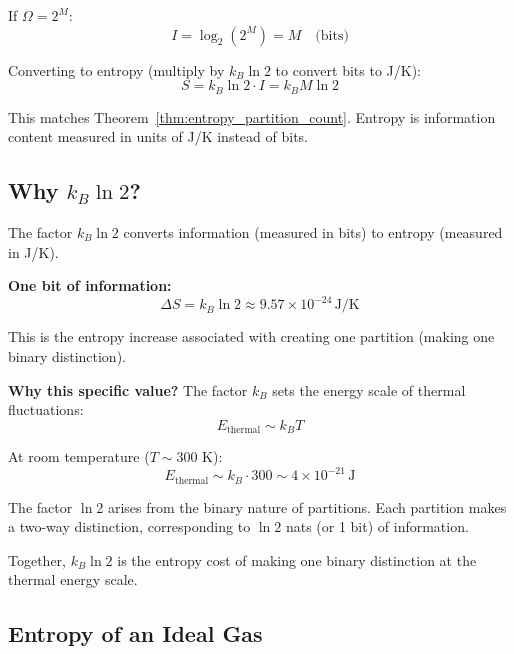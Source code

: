 \documentclass[twocolumn,10pt]{article}
\theoremstyle{definition}
\theoremstyle{remark}
\begin{document}
If $\Omega = 2^M$:
\begin{equation}
I = \log_2(2^M) = M \quad \text{(bits)}
\end{equation}

Converting to entropy (multiply by $k_B \ln 2$ to convert bits to J/K):
\begin{equation}
S = k_B \ln 2 \cdot I = k_B M \ln 2
\end{equation}

This matches Theorem~\ref{thm:entropy_partition_count}. Entropy is information content measured in units of J/K instead of bits.

\subsection{Why $k_B \ln 2$?}

The factor $k_B \ln 2$ converts information (measured in bits) to entropy (measured in J/K).

\vspace{0.2cm}
\noindent\textbf{One bit of information:}
\begin{equation}
\Delta S = k_B \ln 2 \approx 9.57 \times 10^{-24} \, \text{J/K}
\end{equation}

This is the entropy increase associated with creating one partition (making one binary distinction).

\vspace{0.2cm}
\noindent\textbf{Why this specific value?} The factor $k_B$ sets the energy scale of thermal fluctuations:
\begin{equation}
E_{\text{thermal}} \sim k_B T
\end{equation}

At room temperature ($T \sim 300$ K):
\begin{equation}
E_{\text{thermal}} \sim k_B \cdot 300 \sim 4 \times 10^{-21} \, \text{J}
\end{equation}

The factor $\ln 2$ arises from the binary nature of partitions. Each partition makes a two-way distinction, corresponding to $\ln 2$ nats (or 1 bit) of information.

\vspace{0.2cm}
\noindent Together, $k_B \ln 2$ is the entropy cost of making one binary distinction at the thermal energy scale.

\subsection{Entropy of an Ideal Gas}
\end{document}
